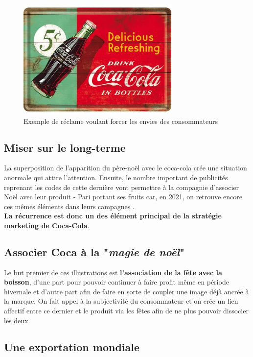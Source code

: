 \begin{figure}[th]
\centering
\includegraphics[width=80mm]{medias/panneau_coca}
\decoRule
\caption{Exemple de réclame voulant forcer les envies des consommateurs }
\end{figure}

\subsection{Miser sur le long-terme}

La superposition de l'apparition du père-noël avec le coca-cola crée une situation anormale qui attire l'attention. Ensuite, le nombre important de publicités reprenant les codes de cette dernière vont permettre à la compagnie d'associer Noël avec leur produit - Pari portant ses fruits car, en 2021, on retrouve encore ces mêmes éléments dans leurs campagnes \parencite{Ref3}.\\
\textbf{La récurrence est donc un des élément principal de la stratégie marketing de Coca-Cola}.

\subsection{Associer Coca à la "\textit{magie de noël}"}

Le but premier de ces illustrations est \textbf{l'association de la fête avec la boisson}, d'une part pour pouvoir continuer à faire profit même en période hivernale et d'autre part afin de faire en sorte de coupler une image déjà ancrée à la marque. On fait appel à la subjectivité du consommateur et on crée un lien affectif entre ce dernier et le produit via les fêtes afin de ne plus pouvoir dissocier les deux.

\subsection{Une exportation mondiale}

